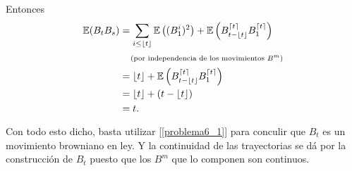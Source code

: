 Entonces
\begin{align}
    \mathbb{E}(B_t B_s) &=  \sum_{i \leq \lfloor t\rfloor} \mathbb{E}\left( (B_1^i)^2 \right) + \mathbb{E}\left( B^{\lceil t \rceil}_{t-\lfloor t\rfloor} B^{\lceil t \rceil}_1\right)                                      \\
                &\;\;\;\;\mbox{{\scriptsize(por independencia de los movimientos $B^m$)}}                                                                                                               \\
                &=  \lfloor t\rfloor + \mathbb{E}\left( B^{\lceil t \rceil}_{t-\lfloor t\rfloor} B^{\lceil t \rceil}_1\right)                                                                             \\
                &=  \lfloor t\rfloor + (t  - \lfloor t\rfloor)                                                                                                                                       \\
                &=  t.                                                                                                                                                          
\end{align}

Con todo esto dicho, basta utilizar [\ref{problema6_1}] para conculir que $B_t$ es un movimiento browniano en ley. Y la continuidad de las
trayectorias se dá por la construcción de $B_t$ puesto que los $B^m$ que lo componen son continuos.